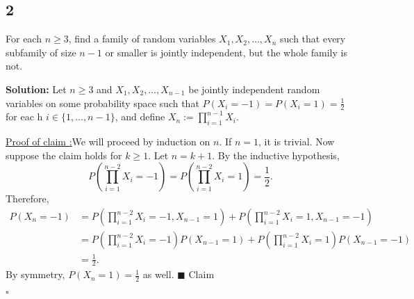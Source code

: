 \documentclass[12pt]{article}
\newcounter{ProofCounter}
\newcounter{ClaimCounter}[ProofCounter]
\newenvironment{Solution}{\stepcounter{ProofCounter}\textbf{Solution:}}{\hfill$\square$}
\newenvironment{claim}[1]{\vspace{1mm}\stepcounter{ClaimCounter}\par\noindent\underline{\bf Claim \theClaimCounter:}\space#1}{}
\newenvironment{claimproof}[1]{\par\noindent\underline{Proof of claim \theClaimCounter:}\space#1}{\hfill $\blacksquare$ Claim \theClaimCounter}
\begin{document}

\subsection*{2}
\begin{tcolorbox}
  For each $n \geq 3$, find a family of random variables $X_1, X_2, \dots, X_n$ such that every subfamily of size $n - 1$ or smaller is jointly independent, but the whole family is not.
\end{tcolorbox}
\begin{Solution}
  Let $n\geq 3$ and $X_1, X_2, \dots, X_{n-1}$ be jointly independent random variables on some probability space such that $P(X_i = -1) = P(X_i = 1) = \frac{1}{2}$ for eac h $ i \in \{1, \dots, n-1 \}$, and define $X_n := \prod_{i=1}^{n-1}X_i$.

  \begin{claimproof}
    We will proceed by induction on $n$. If $n = 1$, it is trivial. Now suppose the claim holds for $k \geq 1$. Let $n = k + 1$. By the inductive hypothesis,
    \[
      P \left( \prod_{i=1}^{n-2}X_i = -1 \right) = P \left( \prod_{i=1}^{n-2}X_i = 1 \right) = \frac{1}{2}.
    \]
    Therefore,
    \begin{align*}
      P(X_n = -1) & = P \left( \prod_{i=1}^{n-2}X_i = -1, X_{n-1} = 1 \right) + P \left( \prod_{i=1}^{n-2}X_i = 1, X_{n-1} = -1 \right) \\
      & = P \left( \prod_{i=1}^{n-2}X_i = -1 \right)P(X_{n-1} = 1) + P \left( \prod_{i=1}^{n-2}X_i = 1 \right)P(X_{n-1} = -1) \\
      & = \frac{1}{2}.
    \end{align*}
    By symmetry, $P(X_n = 1) = \frac{1}{2}$ as well.
  \end{claimproof}


\end{Solution}
\end{document}
